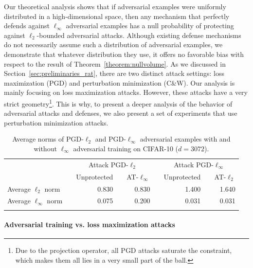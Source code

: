 Our theoretical analysis shows that if adversarial examples were uniformly distributed in a high-dimensional space, then any mechanism that perfectly defends against $\ell_\infty$ adversarial examples has a null probability of protecting against $\ell_2$-bounded adversarial attacks. Although existing defense mechanisms do not necessarily assume such a distribution of adversarial examples, we demonstrate that whatever distribution they use, it offers no favorable bias with respect to the result of Theorem~\ref{theorem:nullvolume}. 
As we discussed in Section~\ref{sec:preliminaries_rat}, there are two distinct attack settings: loss maximization (PGD) and perturbation minimization (C\&W). Our analysis is mainly focusing on loss maximization attacks. However, these attacks have a very strict geometry\footnote{Due to the projection operator, all PGD attacks saturate the constraint, which makes them all lies in a very small part of the ball.}. This is why, to present a deeper analysis of the behavior of adversarial attacks and defenses, we also present a set of experiments that use perturbation minimization attacks.

\begin{table}[htbp]
  \centering 
  \caption{Average norms of PGD-$\ell_2$ and PGD-$\ell_\infty$ adversarial examples with and without $\ell_\infty$ adversarial training on CIFAR-10 ($d=3072$).}
    \begin{tabular}{lrrrrrrrr}
    \toprule
      & \phantom{...}  & \multicolumn{3}{c}{Attack PGD-$\ell_2$} & \phantom{...}  & \multicolumn{3}{c}{Attack PGD-$\ell_\infty$} \\
\cmidrule{3-5}\cmidrule{7-9}      &   & \multicolumn{1}{l}{Unprotected} &  \phantom{...} & \multicolumn{1}{l}{AT-$\ell_\infty$} &   & \multicolumn{1}{l}{Unprotected} & \phantom{...}  & \multicolumn{1}{l}{AT-$\ell_2$} \\
    \midrule
    Average $\ell_2$ norm &   & 0.830 &   & 0.830 &   & 1.400 &   & 1.640 \\
    Average $\ell_\infty$ norm &   & 0.075 &   & 0.200 &   & 0.031 &   & 0.031 \\
    \bottomrule \\
    \end{tabular}%
  \label{tab:mean_norm_pgd_attack_ben}%
\end{table}%

\paragraph{Adversarial training vs. loss maximization attacks}


